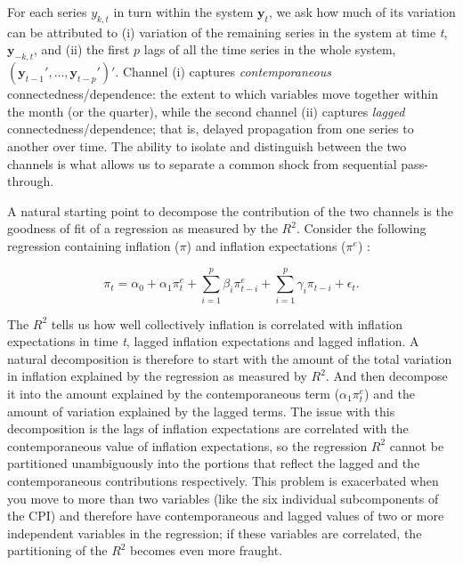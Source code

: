 \documentclass{article}
\begin{document}
For each series $y_{k,t}$ in turn within the system $\bm{y}_t$, we ask how much of its variation can be attributed
to (i) variation of the remaining series in the system at time \textit{t}, $\bm{y}_{-k,t}$, and (ii)
the first $p$ lags of all the time series in the whole system, $(\bm{y}_{t-1}',\dots,\bm{y}_{t-p}')'$.
Channel (i) captures \emph{contemporaneous} connectedness/dependence: the extent to which variables
move together within the month (or the quarter), while the second channel (ii) captures \emph{lagged}
connectedness/dependence; that is, delayed propagation from one series to another over time. The ability to isolate and distinguish between the two channels is what allows us to separate a common shock from
sequential pass-through.

A natural starting point to decompose the contribution of the two channels is the goodness of fit of a regression as measured by the $R^2$. Consider the following regression containing inflation ($\pi$) and inflation expectations ($\pi^e$)
:

\[
\pi_t
=
\alpha_0
+
\alpha_1 \pi_t^e
+
\sum_{i=1}^{p} \beta_i \pi_{t-i}^e
 +
 \sum_{i=1}^{p} \gamma_i \pi_{t-i}
+
\epsilon_t.
\]

The $R^2$ tells us how well collectively inflation is correlated with inflation expectations in time \textit{t}, lagged inflation expectations  and lagged inflation. A natural decomposition is therefore to start with the amount of the total variation in inflation explained by the regression as measured by $R^2$. And then decompose it into the amount explained by the contemporaneous term ($\alpha_1 \pi_t^e$) and the amount of variation explained by the lagged terms. The issue with this decomposition is the lags of inflation expectations are correlated with the contemporaneous value of inflation expectations,  so the regression $R^2$ cannot be partitioned unambiguously into the portions that reflect the lagged and the contemporaneous contributions respectively.  This problem is exacerbated when you move to more than two variables (like the six individual subcomponents of the CPI) and therefore have contemporaneous and lagged values of two or more independent variables in the regression; if these variables are correlated, the partitioning of the $R^2$ becomes even more fraught.
\end{document}
